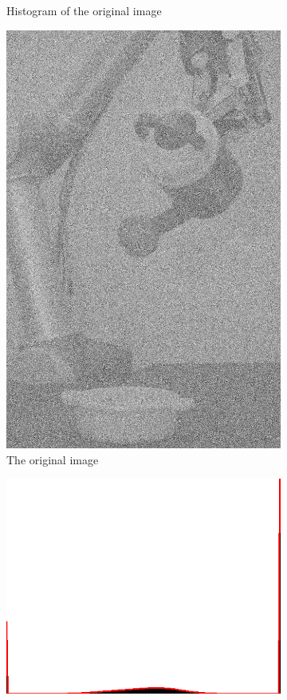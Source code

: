 \begin{figure}[H]
\begin{subfigure}[b]{0.16\textwidth}
        \caption{Histogram of the original image}
        \label{fig:img2_hist}
    \end{subfigure}	
\begin{subfigure}[b]{0.16\textwidth}
        \includegraphics[width=\textwidth]{img2/src.png}
        \caption{The original image}
        \label{fig:img2_src}
    \end{subfigure}
    \begin{subfigure}[b]{0.16\textwidth}
        \includegraphics[width=\textwidth]{img2/hist.png}

\end{subfigure}
\end{figure}
